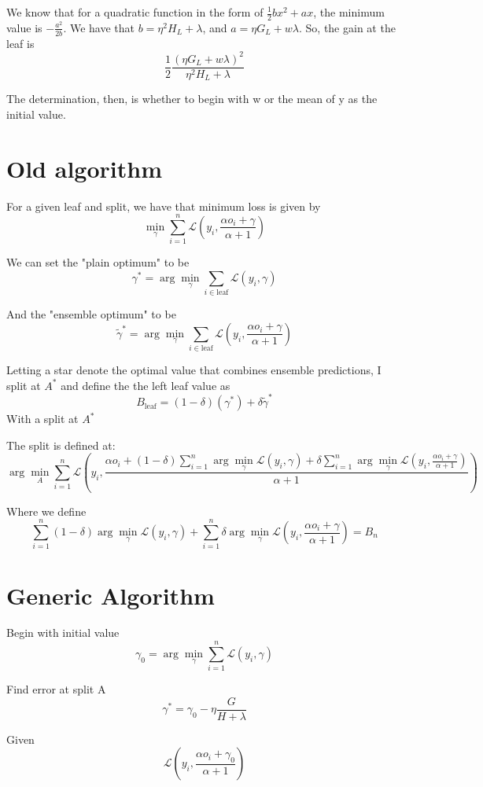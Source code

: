 \documentclass{article}
\begin{document}
We know that for a quadratic function in the form of $\frac{1}{2}bx^2 + ax$, the minimum value is $- \frac{a^2}{2b}$. 
We have that $b = \eta^2 H_L + \lambda$, and $a = \eta G_L + w\lambda$. So, the gain at the leaf is \[
\frac{1}{2} \frac{(\eta G_L + w\lambda)^2}{\eta^2 H_L + \lambda}
\]

The determination, then, is whether to begin with w or the mean of y as the initial value.

\section*{Old algorithm}

For a given leaf and split, we have that minimum loss is given by \[
\min_{\gamma} \sum_{i=1}^{n} \mathcal{L}(y_i, \frac{\alpha o_i + \gamma}{\alpha + 1})
\]

We can set the "plain optimum" to be \[
\gamma^* = \arg \min_\gamma \sum_{i \in \text{leaf}} \mathcal{L}(y_i, \gamma)
\]

And the "ensemble optimum" to be \[
\tilde{\gamma}^* = \arg \min_\gamma \sum_{i \in \text{leaf}} \mathcal{L}(y_i, \frac{\alpha o_i + \gamma}{\alpha + 1})
\]

Letting a star denote the optimal value that combines ensemble predictions, I split at $A^*$ and define the 
the left leaf value as 
\[
B_{\text{leaf}} = (1 - \delta)(\gamma^*) + \delta \tilde{\gamma}^*
\]
With a split at $A^*$

The split is defined at:
\[
\arg\min_A \sum_{i=1}^n \mathcal{L}(y_i, \frac{\alpha o_i + (1 - \delta)\sum_{i=1}^n \arg\min_{\gamma} \mathcal{L}(y_i, \gamma) + \delta \sum_{i=1}^n \arg\min_\gamma \mathcal{L}(y_i, \frac{\alpha o_i + \gamma}{\alpha + 1})}{\alpha + 1})
\]

Where we define \[
    \sum_{i=1}^n (1 - \delta)\arg\min_{\gamma} \mathcal{L}(y_i, \gamma) + \sum_{i=1}^n \delta \arg\min_\gamma \mathcal{L}(y_i, \frac{\alpha o_i + \gamma}{\alpha + 1}) = B_n
\]

\section*{Generic Algorithm}
Begin with initial value \[
    \gamma_0 = \arg\min_{\gamma} \sum_{i=1}^n \mathcal{L}(y_i, \gamma)
\]

Find error at split A \[
\gamma^* = \gamma_0 - \eta \frac{G}{H + \lambda}
\]

Given \[
\mathcal{L}(y_i, \frac{\alpha o_i + \gamma_0}{\alpha + 1})
\]
\end{document}
